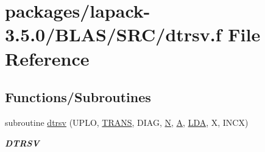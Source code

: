 \hypertarget{lapack-3_85_80_2BLAS_2SRC_2dtrsv_8f}{}\section{packages/lapack-\/3.5.0/\+B\+L\+A\+S/\+S\+R\+C/dtrsv.f File Reference}
\label{lapack-3_85_80_2BLAS_2SRC_2dtrsv_8f}
\subsection*{Functions/\+Subroutines}
\begin{DoxyCompactItemize}
\item 
subroutine \hyperlink{group__double__blas__level1_gad2a01dd62718b28e35b752dbad8474ab}{dtrsv} (U\+P\+L\+O, \hyperlink{superlu__enum__consts_8h_a0c4e17b2d5cea33f9991ccc6a6678d62a1f61e3015bfe0f0c2c3fda4c5a0cdf58}{T\+R\+A\+N\+S}, D\+I\+A\+G, \hyperlink{polmisc_8c_a0240ac851181b84ac374872dc5434ee4}{N}, \hyperlink{classA}{A}, \hyperlink{example__user_8c_ae946da542ce0db94dced19b2ecefd1aa}{L\+D\+A}, X, I\+N\+C\+X)
\begin{DoxyCompactList}\small\item\em {\bfseries D\+T\+R\+S\+V} \end{DoxyCompactList}\end{DoxyCompactItemize}
